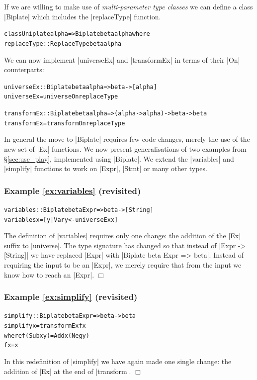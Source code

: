 \documentclass[preprint]{sigplanconf}
\let\cite=\citep
\newcommand{\noexample}{\hfill$\Box$}
\newenvironment{code}{\begin{alltt}\small}{\end{alltt}}
\newenvironment{revisit}[1]{\subsubsection*{Example #1 (revisited)}}{\noexample}
\newcommand{\ignore}{}
\begin{document}
If we are willing to make use of \textit{multi-parameter type classes} \cite{jones:mptc} we can define a class |Biplate| which includes the |replaceType| function.

\begin{code}
class  Uniplate alpha => Biplate beta alpha where
       replaceType :: ReplaceType beta alpha
\end{code}

We can now implement |universeEx| and |transformEx| in terms of their |On| counterparts:

\begin{code}
universeEx   :: Biplate beta alpha => beta -> [alpha]
universeEx   = universeOn   replaceType

transformEx  :: Biplate beta alpha => (alpha -> alpha) -> beta -> beta
transformEx  = transformOn  replaceType
\end{code}

In general the move to |Biplate| requires few code changes, merely the use of the new set of |Ex| functions. We now present generalisations of two examples from \S\ref{sec:use_play}, implemented using |Biplate|. We extend the |variables| and |simplify| functions to work on |Expr|, |Stmt| or many other types.

\begin{revisit}{\ref{ex:variables}}
\begin{code}
variables :: Biplate beta Expr => beta -> [String]
variables x = [y | Var y <- universeEx x]
\end{code}

The definition of |variables| requires only one change: the addition of the |Ex| suffix to |universe|. The type signature has changed so that instead of \ignore|Expr -> [String]| we have replaced |Expr| with \ignore|Biplate beta Expr => beta|. Instead of requiring the input to be an |Expr|, we merely require that from the input we know how to reach an |Expr|.
\end{revisit}

\begin{revisit}{\ref{ex:simplify}}
\begin{code}
simplify :: Biplate beta Expr => beta -> beta
simplify x = transformEx f x
    where  f (Sub x y)  = Add x (Neg y)
           f x          = x
\end{code}

In this redefinition of |simplify| we have again made one single change: the addition of |Ex| at the end of |transform|.
\end{revisit}
\end{document}
